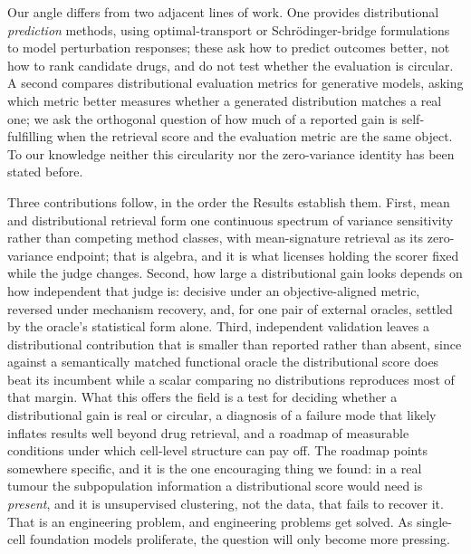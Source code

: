 \documentclass[11pt,letterpaper]{article}
\begin{document}
Our angle differs from two adjacent lines of work. One provides distributional \emph{prediction} methods, using optimal-transport or Schr\"odinger-bridge formulations to model perturbation responses\cite{CellOT,Departures}; these ask how to predict outcomes better, not how to rank candidate drugs, and do not test whether the evaluation is circular. A second compares distributional evaluation metrics for generative models\cite{OptimalMetrics,StandardizedEval}, asking which metric better measures whether a generated distribution matches a real one; we ask the orthogonal question of how much of a reported gain is self-fulfilling when the retrieval score and the evaluation metric are the same object. To our knowledge neither this circularity nor the zero-variance identity has been stated before.

Three contributions follow, in the order the Results establish them. First, mean and distributional retrieval form one continuous spectrum of variance sensitivity rather than competing method classes, with mean-signature retrieval as its zero-variance endpoint; that is algebra, and it is what licenses holding the scorer fixed while the judge changes. Second, how large a distributional gain looks depends on how independent that judge is: decisive under an objective-aligned metric, reversed under mechanism recovery, and, for one pair of external oracles, settled by the oracle's statistical form alone. Third, independent validation leaves a distributional contribution that is smaller than reported rather than absent, since against a semantically matched functional oracle the distributional score does beat its incumbent while a scalar comparing no distributions reproduces most of that margin. What this offers the field is a test for deciding whether a distributional gain is real or circular, a diagnosis of a failure mode that likely inflates results well beyond drug retrieval\cite{ref16,ref17}, and a roadmap of measurable conditions under which cell-level structure can pay off. The roadmap points somewhere specific, and it is the one encouraging thing we found: in a real tumour the subpopulation information a distributional score would need is \emph{present}, and it is unsupervised clustering, not the data, that fails to recover it. That is an engineering problem, and engineering problems get solved. As single-cell foundation models proliferate, the question will only become more pressing.

\end{document}
